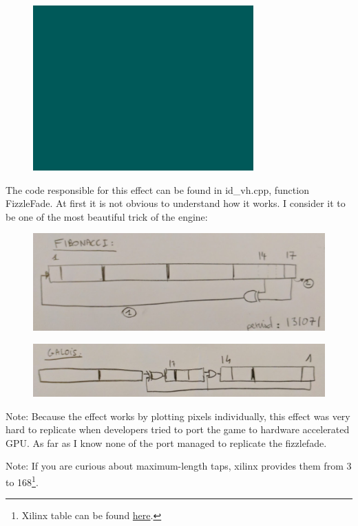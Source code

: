 \begin{figure}[H] \centering \includegraphics[scale=1.0]{imgs/fizzlefade/boss/screenshot_130.png} \end{figure}        

The code responsible for this effect can be found in id\_vh.cpp, function FizzleFade. At first it is not obvious to understand how it works. I consider it to be one of the most beautiful trick of the engine:
\newpage


        \begin{figure}[H] \centering \includegraphics[scale=0.3]{imgs/fizzlefade/fibonnaci.png} \end{figure}
    \begin{figure}[H] \centering \includegraphics[scale=0.3]{imgs/fizzlefade/galois.png} \end{figure}
      
Note: Because the effect works by plotting pixels individually, this effect was very hard to replicate when developers tried to port the game to hardware accelerated GPU. As far as I know none of the port managed to replicate the fizzlefade.

Note: If you are curious about maximum-length taps, xilinx provides them from 3 to 168\footnote{Xilinx table can be found \href{http://www.xilinx.com/support/documentation/application\_notes/xapp052.pdf}{here}.}.